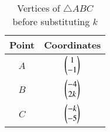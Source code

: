 \begin{table}[h!]
    \centering
    \begin{tabular}{|c|c|}
        \hline
        Point & Coordinates \\
        \hline
	    $A$ & $\begin{pmatrix}1\\-1\end{pmatrix}$ \\
	    $B$ & $\begin{pmatrix}-4\\2k\end{pmatrix}$ \\
	    $C$ & $\begin{pmatrix}-k\\-5\end{pmatrix}$ \\
        \hline
    \end{tabular}
    \caption{Vertices of $\triangle ABC$ before substituting $k$}
    \label{tab:triangle_k}
\end{table}
